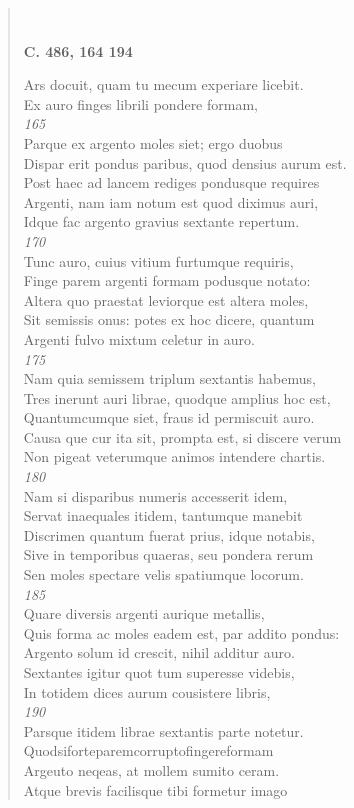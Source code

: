 \documentclass[11pt, a4paper]{report}
\begin{document}
\begin{verse}
        ﻿\pagebreak 
    \begin{center} \textbf{C. 486, 164 194} \end{center} \marginpar{[36]} Ars docuit, quam tu mecum experiare licebit. \\ Ex auro finges librili pondere formam, \\ \textit{165} \\ Parque ex argento moles siet; ergo duobus \\ Dispar erit pondus paribus, quod densius aurum est. \\ Post haec ad lancem rediges pondusque requires \\ Argenti, nam iam notum est quod diximus auri, \\ Idque fac argento gravius sextante repertum. \\ \textit{170} \\ Tunc auro, cuius vitium furtumque requiris, \\ Finge parem argenti formam podusque notato: \\ Altera quo praestat leviorque est altera moles, \\ Sit semissis onus: potes ex hoc dicere, quantum \\ Argenti fulvo mixtum celetur in auro. \\ \textit{175} \\ Nam quia semissem triplum sextantis habemus, \\ Tres inerunt auri librae, quodque amplius hoc est, \\ Quantumcumque siet, fraus id permiscuit auro. \\ Causa \lbrack que \rbrack  cur ita sit, prompta est, si discere verum \\ Non pigeat veterumque animos intendere chartis. \\ \textit{180} \\ Nam si disparibus numeris accesserit idem, \\ Servat inaequales itidem, tantumque manebit \\ Discrimen quantum fuerat prius, idque notabis, \\ Sive in temporibus quaeras, seu pondera rerum \\ Sen moles spectare velis spatiumque locorum. \\ \textit{185} \\ Quare diversis argenti aurique metallis, \\ Quis forma ac moles eadem est, par addito pondus: \\ Argento solum id crescit, nihil additur auro. \\ Sextantes igitur quot tum superesse videbis, \\ In totidem dices aurum cousistere libris, \\ \textit{190} \\ Parsque itidem librae sextantis parte notetur. \\ Quodsiforteparemcorruptofingereformam \\ Argeuto neqeas, at mollem sumito ceram. \\ Atque brevis facilisque tibi formetur imago \\ 

\end{verse}
\end{document}
